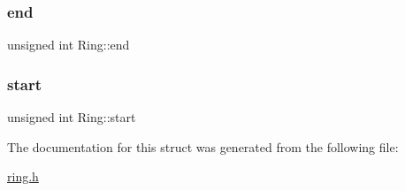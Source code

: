 \subsubsection{\texorpdfstring{end}{end}}
{\footnotesize\ttfamily unsigned int Ring\+::end}

\mbox{\label{structRing_a05ded3e84726b36d0b2266e733ddc61e}} 
\subsubsection{\texorpdfstring{start}{start}}
{\footnotesize\ttfamily unsigned int Ring\+::start}



The documentation for this struct was generated from the following file\+:\begin{DoxyCompactItemize}
\item 
\hyperlink{ring_8h}{ring.\+h}\end{DoxyCompactItemize}
